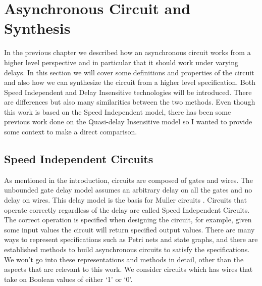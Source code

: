 \documentclass[12pt]{report}
\begin{document}
\section{Asynchronous Circuit and Synthesis}
In the previous chapter we described how an asynchronous circuit works from a higher level perspective and in particular that it should work under varying delays.  In this section we will cover some definitions and properties of the circuit and also how we can synthesize the circuit from a higher level specification.  Both Speed Independent and Delay Insensitive technologies will be introduced.  There are differences but also many similarities between the two methods.  Even though this work is based on the Speed Independent model, there has been some previous work done on the Quasi-delay Insensitive model so I wanted to provide some context to make a direct comparison.

\subsection{Speed Independent Circuits}
As mentioned in the introduction, circuits are composed of gates and wires.  The unbounded gate delay model assumes an arbitrary delay on all the gates and no delay on wires.  This delay model is the basis for Muller circuits \cite{Muller_59}.  Circuits that operate correctly regardless of the delay are called Speed Independent Circuits.  The correct operation is specified when designing the circuit, for example, given some input values the circuit will return specified output values.  
There are many ways to represent specifications such as Petri nets and state graphs, and there are established methods to build asynchronous circuits to satisfy the specifications.  We won't go into these representations and methods in detail, other than the aspects that are relevant to this work.  We consider circuits which has wires that take on Boolean values of either `1' or `0'.\\
  
\end{document}
